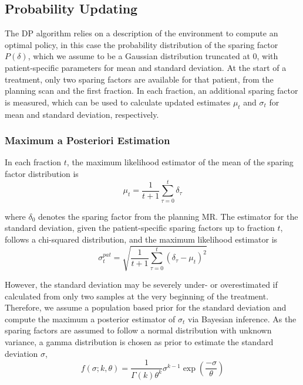 \documentclass[\relativeRoot/ada.tex]{subfiles}
\begin{document}
\subsection{Probability Updating}
\label{sec:probupdate}
The DP algorithm relies on a description of the environment to compute an optimal policy, in this case the probability distribution of the sparing factor $P(\delta)$, which we assume to be a Gaussian distribution truncated at $0$, with patient-specific parameters for mean and standard deviation. At the start of a treatment, only two sparing factors are available for that patient, from the planning scan and the first fraction. In each fraction, an additional sparing factor is measured, which can be used to calculate updated estimates $\mu_t$ and $\sigma_t$ for mean and standard deviation, respectively.

\subsubsection{Maximum a Posteriori Estimation}
In each fraction $t$, the maximum likelihood estimator of the mean of the sparing factor distribution is
\begin{equation}\label{eq:mean}
\mu_t = \frac{1}{t+1}\sum_{\tau=0}^t \delta_\tau
\end{equation}

where $\delta_0$ denotes the sparing factor from the planning MR. The estimator for the standard deviation, given the patient-specific sparing factors up to fraction $t$, follows a chi-squared distribution, and the maximum likelihood estimator is
\begin{equation}
\sigma_t^{pat} = \sqrt{ \frac{1}{t+1}\sum_{\tau=0}^t \left( \delta_\tau - \mu_t \right)^2 }
\end{equation}

However, the standard deviation may be severely under- or overestimated if calculated from only two samples at the very beginning of the treatment. Therefore, we assume a population based prior for the standard deviation and compute the maximum a posterior estimator of $\sigma_t$ via Bayesian inference. As the sparing factors are assumed to follow a normal distribution with unknown variance, a gamma distribution is chosen as prior to estimate the standard deviation $\sigma$,
\begin{equation}
    f(\sigma;k,\theta) = \frac{1}{\Gamma(k)\theta^k}\sigma^{k-1}\exp\left(\frac{-\sigma}{\theta}\right)
\end{equation}
\end{document}

